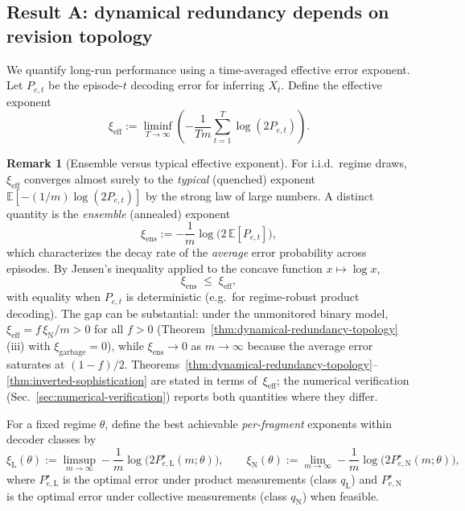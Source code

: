 \documentclass[11pt]{article}
\newcommand{\E}{\mathbb{E}}
\newcommand{\1}{\mathbf{1}}
\newcommand{\QCBdist}{\xi}
\theoremstyle{definition}
\newtheorem{remark}{Remark}
\theoremstyle{plain}
\begin{document}
\subsection{Result A: dynamical redundancy depends on revision topology}

We quantify long-run performance using a time-averaged effective error exponent.
Let $P_{e,t}$ be the episode-$t$ decoding error for inferring $X_t$.
Define the effective exponent
\begin{equation}
\QCBdist_{\mathrm{eff}}
:=
\liminf_{T\to\infty}
\left(
-\frac{1}{Tm}
\sum_{t=1}^{T}\log(2P_{e,t})
\right).
\label{eq:xi-eff}
\end{equation}

\begin{remark}[Ensemble versus typical effective exponent]
\label{rem:ens-vs-typ}
For i.i.d.\ regime draws, $\QCBdist_{\mathrm{eff}}$ converges almost surely
to the \emph{typical} (quenched) exponent
$\E\!\left[-(1/m)\log(2P_{e,t})\right]$ by the strong law of large numbers.
A distinct quantity is the \emph{ensemble} (annealed) exponent
\[
\QCBdist_{\mathrm{ens}}
:=
-\frac{1}{m}\log\!\bigl(2\,\E[P_{e,t}]\bigr),
\]
which characterizes the decay rate of the \emph{average} error probability
across episodes.
By Jensen's inequality applied to the concave function
$x\mapsto\log x$,
\[
\QCBdist_{\mathrm{ens}} \;\le\; \QCBdist_{\mathrm{eff}},
\]
with equality when $P_{e,t}$ is deterministic (e.g.\ for regime-robust
product decoding).
The gap can be substantial: under the unmonitored binary model,
$\QCBdist_{\mathrm{eff}}=f\,\QCBdist_{\mathrm{N}}/m > 0$ for all $f>0$
(Theorem~\ref{thm:dynamical-redundancy-topology}(iii) with
$\QCBdist_{\mathrm{garbage}}=0$), while $\QCBdist_{\mathrm{ens}}\to 0$ as
$m\to\infty$ because the average error saturates at $(1{-}f)/2$.
Theorems~\ref{thm:dynamical-redundancy-topology}--\ref{thm:inverted-sophistication}
are stated in terms of~$\QCBdist_{\mathrm{eff}}$; the numerical verification
(Sec.~\ref{sec:numerical-verification}) reports both quantities where they
differ.
\end{remark}

For a fixed regime $\theta$, define the best achievable \emph{per-fragment} exponents within decoder classes by
\[
\QCBdist_{\mathrm{L}}(\theta):=
\limsup_{m\to\infty}-\frac{1}{m}\log\!\bigl(2P_{e,\mathrm{L}}^\star(m;\theta)\bigr),
\qquad
\QCBdist_{\mathrm{N}}(\theta):=
\lim_{m\to\infty}-\frac{1}{m}\log\!\bigl(2P_{e,\mathrm{N}}^\star(m;\theta)\bigr),
\]
where $P_{e,\mathrm{L}}^\star$ is the optimal error under product measurements (class $q_{\mathrm{L}}$) and $P_{e,\mathrm{N}}^\star$ is the optimal error under collective measurements (class $q_{\mathrm{N}}$) when feasible.
\end{document}

